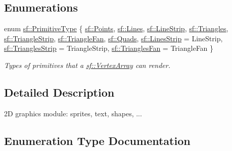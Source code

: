 \subsection*{Enumerations}
\begin{DoxyCompactItemize}
\item 
enum \hyperlink{group__graphics_ga5ee56ac1339984909610713096283b1b}{sf\+::\+Primitive\+Type} \{ \newline
\hyperlink{group__graphics_gga5ee56ac1339984909610713096283b1bac7097d3e01778b9318def1f7ac35a785}{sf\+::\+Points}, 
\hyperlink{group__graphics_gga5ee56ac1339984909610713096283b1ba2bf015eeff9f798dfc3d6d744d669f1e}{sf\+::\+Lines}, 
\hyperlink{group__graphics_gga5ee56ac1339984909610713096283b1ba14d9eeec2c7c314f239a57bde35949fa}{sf\+::\+Line\+Strip}, 
\hyperlink{group__graphics_gga5ee56ac1339984909610713096283b1ba880a7aa72c20b9f9beb7eb64d2434670}{sf\+::\+Triangles}, 
\newline
\hyperlink{group__graphics_gga5ee56ac1339984909610713096283b1ba05e55fec6d32c2fc8328f94d07f91184}{sf\+::\+Triangle\+Strip}, 
\hyperlink{group__graphics_gga5ee56ac1339984909610713096283b1ba363f7762b33706c805c6a451ad554f5e}{sf\+::\+Triangle\+Fan}, 
\hyperlink{group__graphics_gga5ee56ac1339984909610713096283b1ba5041359b76b4bd3d3e6ef738826b8743}{sf\+::\+Quads}, 
\hyperlink{group__graphics_gga5ee56ac1339984909610713096283b1ba5b09910f5d0f39641342184ccd0d1de3}{sf\+::\+Lines\+Strip} = Line\+Strip, 
\newline
\hyperlink{group__graphics_gga5ee56ac1339984909610713096283b1ba66643dbbb24bbacb405973ed80eebae0}{sf\+::\+Triangles\+Strip} = Triangle\+Strip, 
\hyperlink{group__graphics_gga5ee56ac1339984909610713096283b1ba5338a2c6d922151fe50f235036af8a20}{sf\+::\+Triangles\+Fan} = Triangle\+Fan
 \}\begin{DoxyCompactList}\small\item\em Types of primitives that a \hyperlink{classsf_1_1_vertex_array}{sf\+::\+Vertex\+Array} can render. \end{DoxyCompactList}
\end{DoxyCompactItemize}


\subsection{Detailed Description}
2D graphics module\+: sprites, text, shapes, ... 

\subsection{Enumeration Type Documentation}
\mbox{\label{group__graphics_ga5ee56ac1339984909610713096283b1b}} 
